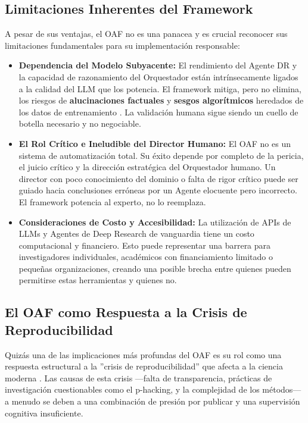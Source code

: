 \documentclass[11pt, a4paper]{article}
\begin{document}
\subsection{Limitaciones Inherentes del Framework}
A pesar de sus ventajas, el OAF no es una panacea y es crucial reconocer sus limitaciones fundamentales para su implementación responsable:
\begin{itemize}
    \item \textbf{Dependencia del Modelo Subyacente:} El rendimiento del Agente DR y la capacidad de razonamiento del Orquestador están intrínsecamente ligados a la calidad del LLM que los potencia. El framework mitiga, pero no elimina, los riesgos de \textbf{alucinaciones factuales} y \textbf{sesgos algorítmicos} heredados de los datos de entrenamiento \cite{fairnow2025}. La validación humana sigue siendo un cuello de botella necesario y no negociable.
    
    \item \textbf{El Rol Crítico e Ineludible del Director Humano:} El OAF no es un sistema de automatización total. Su éxito depende por completo de la pericia, el juicio crítico y la dirección estratégica del Orquestador humano. Un director con poco conocimiento del dominio o falta de rigor crítico puede ser guiado hacia conclusiones erróneas por un Agente elocuente pero incorrecto. El framework potencia al experto, no lo reemplaza.
    
    \item \textbf{Consideraciones de Costo y Accesibilidad:} La utilización de APIs de LLMs y Agentes de Deep Research de vanguardia tiene un costo computacional y financiero. Esto puede representar una barrera para investigadores individuales, académicos con financiamiento limitado o pequeñas organizaciones, creando una posible brecha entre quienes pueden permitirse estas herramientas y quienes no.
\end{itemize}

\subsection{El OAF como Respuesta a la Crisis de Reproducibilidad}
Quizás una de las implicaciones más profundas del OAF es su rol como una respuesta estructural a la ''crisis de reproducibilidad'' que afecta a la ciencia moderna \cite{pnas2018}. Las causas de esta crisis —falta de transparencia, prácticas de investigación cuestionables como el p-hacking, y la complejidad de los métodos— a menudo se deben a una combinación de presión por publicar y una supervisión cognitiva insuficiente.
\end{document}
